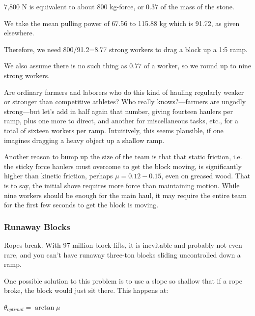 \documentclass[letterpaper,11pt]{article}
\begin{document}
7,800 N is equivalent to about 800 kg-force, or 0.37 of the mass of the stone.


We take the mean pulling power of 67.56 to 115.88 kg which is 91.72, as given elsewhere.

Therefore, we need 800/91.2=8.77 strong workers to drag a block up a 1:5 ramp. 

We  also assume there is no such thing as 0.77 of a worker, so we round up to nine strong workers.

Are ordinary farmers and laborers who do this kind of hauling regularly weaker or stronger than competitive athletes? 
Who really knows?---farmers are ungodly strong---but let's add in half again that number, giving fourteen haulers per ramp, plus one more to direct, 
and another for miscellaneous tasks, etc., for a total of sixteen workers per ramp.  
Intuitively, this seems plausible, if one imagines dragging a heavy object up a shallow ramp.



Another reason to bump up the size of the team is that that static friction, i.e. the sticky force haulers must overcome to get the block moving, 
is significantly higher than kinetic friction, perhaps $\mu = 0.12-0.15$, even on greased wood. 
That is to say, the initial shove requires more force than maintaining motion.  
While nine workers should be enough for the main haul, it may require the entire team for the first few seconds to get the block is moving.


\subsubsection{Runaway Blocks}

Ropes break. 
With 97 million block-lifts, it is inevitable and probably not even rare, and you can't have runaway three-ton blocks sliding uncontrolled down a ramp.   

One possible solution to this problem is to use a slope so shallow that if a rope broke, the block would just sit there.  This happens at: 

\vspace{10pt}
	$\theta_{optimal} = \arctan \mu $
\vspace{10pt}
\end{document}

